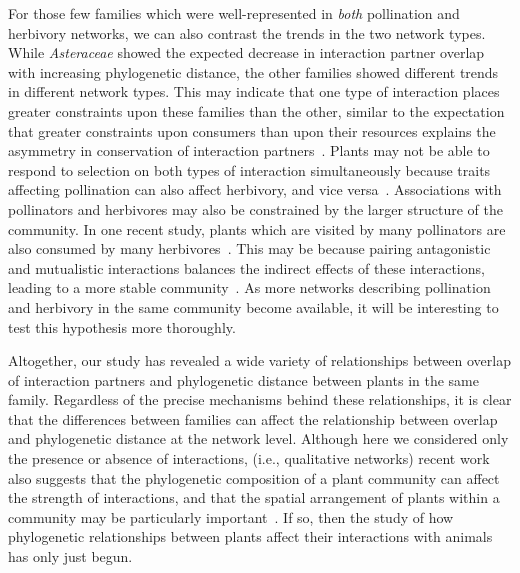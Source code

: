 \documentclass[12pt]{article}
\begin{document}
\begin{spacing}{1.5}
  For those few families which were well-represented in \emph{both} pollination
  and herbivory networks, we can also contrast the 
  trends in the two network types. While \emph{Asteraceae} showed the
  expected decrease in interaction partner overlap with increasing
  phylogenetic distance, the other families showed different trends in
  different network types. This may indicate that one type of interaction
  places greater constraints upon these families than the other, 
  similar to the expectation that greater constraints upon consumers 
  than upon their resources explains the asymmetry in conservation  
  of interaction partners~\citep{Fontaine2015}. Plants
  may not be able to respond to selection on both types of interaction
  simultaneously because traits affecting pollination can also affect herbivory, and vice
  versa~\citep{Strauss1997,Strauss2002,Adler2004,Adler2006,Theis2006}.
  Associations with pollinators and herbivores may also be constrained by the
  larger structure of the community. In one recent study, plants which are 
  visited by many pollinators are also consumed by many herbivores~\citep{Sauve2016}.
  This may be because pairing antagonistic and mutualistic interactions
  balances the indirect effects of these interactions, leading to a
  more stable community~\citep{Sauve2014}. As more networks describing 
  pollination and herbivory in the same community become available, it 
  will be interesting to test this hypothesis more thoroughly.


  Altogether, our study has revealed a wide variety of relationships 
  between overlap of interaction partners and phylogenetic distance 
  between plants in the same family. Regardless of the precise mechanisms
  behind these relationships, it is clear
  that the differences between families can affect the relationship
  between overlap and phylogenetic distance at the network level.  
  Although here we considered only the presence or absence of interactions,
  (i.e., qualitative networks)
  recent work also suggests that the phylogenetic composition of a plant
  community can affect the strength of 
  interactions, and that the spatial arrangement of plants within a 
  community may be particularly important~\citep{Yguel2011,Castagneyrol2014}.
  If so, then the study of how phylogenetic relationships between plants
  affect their interactions with animals has only just begun.



\end{spacing}
\end{document}
